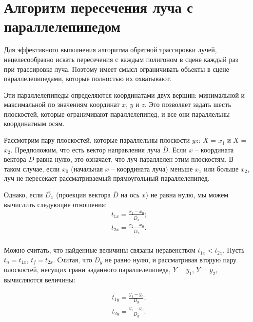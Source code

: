 \section{Алгоритм пересечения луча с параллелепипедом}

Для эффективного выполнения алгоритма обратной трассировки лучей, нецелесообразно искать пересечения с каждым полигоном в сцене каждый раз при трассировке луча. 
Поэтому имеет смысл ограничивать объекты в сцене параллелепипедами, которые полностью их охватывают.

Эти параллелепипеды определяются координатами двух вершин: минимальной и максимальной по значениям координат $x$, $y$ и $z$. 
Это позволяет задать шесть плоскостей, которые ограничивают параллелепипед, и все они параллельны координатным осям.

Рассмотрим пару плоскостей, которые параллельны плоскости $yz$: $X$ = $x_1$ и $X$ = $x_2$. 
Предположим, что есть вектор направления луча $\overline{D}$. 
Если $x$ -- координата вектора $\overline{D}$ равна нулю, это означает, что луч параллелен этим плоскостям. 
В таком случае, если $x_0$ (начальная $x$ -- координата луча) меньше $x_1$ или больше $x_2$, луч не пересекает рассматриваемый прямоугольный параллелепипед.

Однако, если $\overline{D_x}$ (проекция вектора $\overline{D}$ на ось $x$) не равна нулю, мы можем вычислить следующие отношения:
\begin{equation}
	\begin{aligned}
		& t_{1x} = \frac{x_1 - x_0}{\overline{D_x}}; \\ 
		& t_{2x} = \frac{x_2 - x_0}{\overline{D_x}}. \\
	\end{aligned}
\end{equation} 

Можно считать, что найденные величины связаны неравенством $t_{1x} < t_{2x}$.
Пусть $t_n = t_{1x}$, $t_f = t_{2x}$. 
Считая, что $D_y$ не равно нулю, и рассматривая вторую пару плоскостей, несущих грани заданного параллелепипеда, $Y = y_1$, $Y = y_2$, вычисляются величины:

\begin{equation}
	\begin{aligned}
		& t_{1y} = \frac{y_1 - y_0}{D_y}; \\ 
		& t_{2y} = \frac{y_2 - y_0}{D_y}. \\
	\end{aligned}
\end{equation} 


